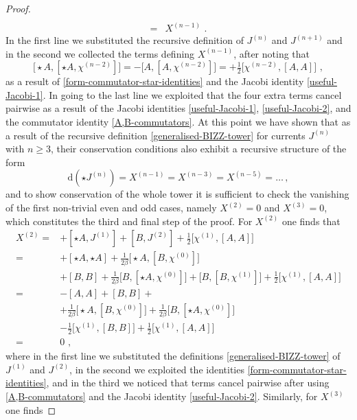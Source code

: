 \documentclass[10pt,a4paper]{amsart}
\begin{document}
\begin{proof}
\begin{equation}
\begin{aligned}
\\
=&X^{(n-1)} \,\, .
\end{aligned}
\end{equation}
In the first line we substituted the recursive definition of $J^{(n)}$ and $J^{(n+1)}$ and in the second we collected the terms defining $X^{(n-1)}$, after noting that 
\begin{equation}
\bigl[\star A,[\star A,\chi^{(n-2)}] \bigr]=-\bigl[ A,[ A,\chi^{(n-2)}] \bigr] =+\tfrac{1}{2}\bigl[ \chi^{(n-2)},[A,A]\bigr] \,\, ,
\end{equation}
as a result of \eqref{form-commutator-star-identities} and the Jacobi identity \eqref{useful-Jacobi-1}. In going to the last line we exploited that the four extra terms cancel pairwise as a result of the Jacobi identities \eqref{useful-Jacobi-1}, \eqref{useful-Jacobi-2}, and the commutator identity \eqref{A,B-commutators}. At this point we have shown that as a result of the recursive definition \eqref{generalised-BIZZ-tower} for currents $J^{(n)}$ with $n\geq 3$, their conservation conditions also exhibit a recursive structure of the form
\begin{equation}
\mathrm{d}(\star J^{(n)})=X^{(n-1)}=X^{(n-3)}=X^{(n-5)} = \ldots \, ,
\end{equation}
and to show conservation of the whole tower it is sufficient to check the vanishing of the first non-trivial even and odd cases, namely $X^{(2)}=0$ and $X^{(3)}=0$, which constitutes the third and final step of the proof. For $X^{(2)}$ one finds that
%
\begin{equation}
\begin{aligned}
X^{(2)}=&+[\star A,J^{(1)}]+[ B,J^{(2)}]+\tfrac{1}{2}\bigl[\chi^{(1)},[A,A]\bigr]
\\
=&+[\star A,\star A]+\tfrac{1}{2\beta}\bigl[\star A,[B,\chi^{(0)}]\bigr]
\\
&+[B,B]+\tfrac{1}{2\beta}\bigl[B,[\star A,\chi^{(0)}]\bigr]+\bigl[B,[B,\chi^{(1)}]\bigr]+\tfrac{1}{2}\bigl[\chi^{(1)},[A,A]\bigr]
\\
=&-[A,A]+[B,B]+
\\
&+\tfrac{1}{2\beta}\bigl[\star A,[B,\chi^{(0)}]\bigr]+\tfrac{1}{2\beta}\bigl[B,[\star A,\chi^{(0)}]\bigr]
\\
&-\tfrac{1}{2}\bigl[\chi^{(1)},[B,B]\bigr]+\tfrac{1}{2}\bigl[\chi^{(1)},[A,A]\bigr]
\\
=&0 \,\, ,
\end{aligned}
\end{equation}
where in the first line we substituted the definitions \eqref{generalised-BIZZ-tower} of $J^{(1)}$ and $J^{(2)}$, in the second we exploited the identities \eqref{form-commutator-star-identities}, and in the third we noticed that terms cancel pairwise after using \eqref{A,B-commutators} and the Jacobi identity \eqref{useful-Jacobi-2}. Similarly, for $X^{(3)}$ one finds

\end{proof}
\end{document}
